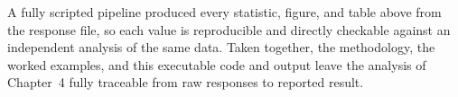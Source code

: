 A fully scripted pipeline produced every statistic, figure, and table above from the response file, so each value is reproducible and directly checkable against an independent analysis of the same data. Taken together, the methodology, the worked examples, and this executable code and output leave the analysis of Chapter~4 fully traceable from raw responses to reported result.

